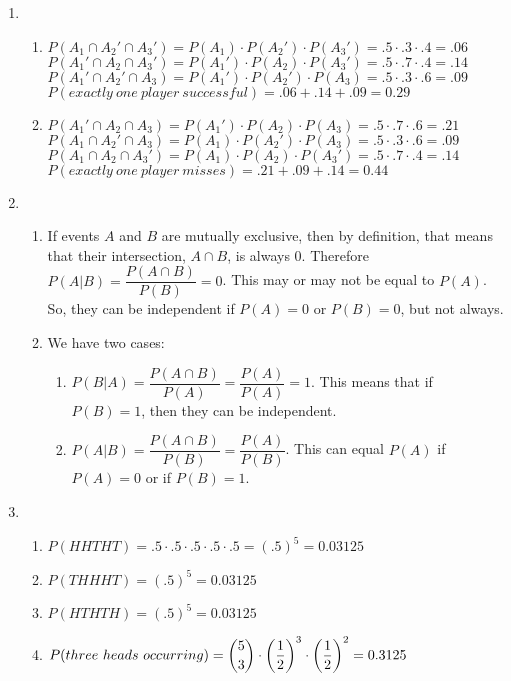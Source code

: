 \documentclass{article}
\begin{document}
\begin{enumerate}
      \item
	\begin{enumerate}
	 \item 
	    $P(A_1 \cap A_2' \cap A_3') = P(A_1)\cdot P(A_2')\cdot P(A_3') = .5\cdot.3\cdot.4 = .06$\\
	    $P(A_1' \cap A_2 \cap A_3') = P(A_1')\cdot P(A_2)\cdot P(A_3') = .5\cdot.7\cdot.4 = .14$\\
	    $P(A_1' \cap A_2' \cap A_3) = P(A_1')\cdot P(A_2')\cdot P(A_3) = .5\cdot.3\cdot.6 = .09$\\
	    $P(exactly\ one\ player\ successful) = .06+.14+.09 = 0.29$
	 \item 
	    $P(A_1' \cap A_2 \cap A_3) = P(A_1')\cdot P(A_2)\cdot P(A_3) = .5\cdot.7\cdot.6 = .21$\\
	    $P(A_1 \cap A_2' \cap A_3) = P(A_1)\cdot P(A_2')\cdot P(A_3) = .5\cdot.3\cdot.6 = .09$\\
	    $P(A_1 \cap A_2 \cap A_3') = P(A_1)\cdot P(A_2)\cdot P(A_3') = .5\cdot.7\cdot.4 = .14$\\
	    $P(exactly\ one\ player\ misses) = .21+.09+.14 = 0.44$
	\end{enumerate}
      \addtocounter{enumi}{3}
      
      \item 
	\begin{enumerate}
	 \item 
	    If events $A$ and $B$ are mutually exclusive, then by definition, that means that 
	 their intersection, $A\cap B$, is always 0. Therefore $P(A|B) = \dfrac{P(A\cap B)}{P(B)} = 0$. 
	 This may or may not be equal to $P(A)$. So, they can be independent if $P(A) = 0$ or 
	 $P(B) = 0$, but not always.
	 
	 \item 
	    We have two cases: 
	      \begin{enumerate}
	       \item $P(B|A) = \dfrac{P(A \cap B)}{P(A)} = \dfrac{P(A)}{P(A)} = 1$. This
		means that if $P(B) = 1$, then they can be independent. 
	    
	       \item $P(A|B) = \dfrac{P(A \cap B)}{P(B)} = \dfrac{P(A)}{P(B)}$. This can equal $P(A)$
		if $P(A) = 0$ or if $P(B) = 1$.
	      \end{enumerate}	    
	\end{enumerate}
	  
      \item 
	\begin{enumerate}
	 \item $P(HHTHT) = .5\cdot.5\cdot.5\cdot.5\cdot.5 = (.5)^5 = 0.03125$
	 \item $P(THHHT) = (.5)^5 = 0.03125$
	 \item $P(HTHTH) = (.5)^5 = 0.03125$
	 \item $P(three\ heads\ occurring) 
	 = \dbinom{5}{3}\cdot\left(\dfrac{1}{2}\right)^3\cdot\left(\dfrac{1}{2}\right)^2 = 0.3125$
	\end{enumerate}
      \addtocounter{enumi}{5}


\end{enumerate}
\end{document}
